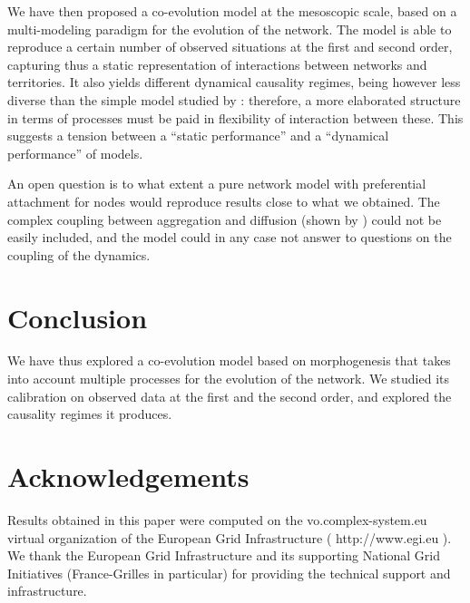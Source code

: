 We have then proposed a co-evolution model at the mesoscopic scale, based on a multi-modeling paradigm for the evolution of the network. The model is able to reproduce a certain number of observed situations at the first and second order, capturing thus a static representation of interactions between networks and territories. It also yields different dynamical causality regimes, being however less diverse than the simple model studied by \cite{raimbault2017identification}: therefore, a more elaborated structure in terms of processes must be paid in flexibility of interaction between these. This suggests a tension between a ``static performance'' and a ``dynamical performance'' of models.


An open question is to what extent a pure network model with preferential attachment for nodes would reproduce results close to what we obtained. The complex coupling between aggregation and diffusion (shown by \cite{2017arXiv170806743R}) could not be easily included, and the model could in any case not answer to questions on the coupling of the dynamics.



\section*{Conclusion}

We have thus explored a co-evolution model based on morphogenesis that takes into account multiple processes for the evolution of the network. We studied its calibration on observed data at the first and the second order, and explored the causality regimes it produces.



\section*{Acknowledgements}

Results obtained in this paper were computed on the vo.complex-system.eu virtual organization of the European Grid Infrastructure ( http://www.egi.eu ). We thank the European Grid Infrastructure and its supporting National Grid Initiatives (France-Grilles in particular) for providing the technical support and infrastructure.






\footnotesize

\begin{multicols}{2}


\end{multicols}






